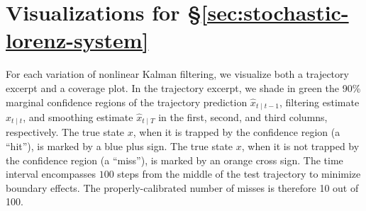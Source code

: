 \documentclass{article} %
\begin{document}
\section{Visualizations for \S\ref{sec:stochastic-lorenz-system}}
\label{sec:visualizations}
For each variation of nonlinear Kalman filtering, we visualize both a trajectory excerpt and a coverage plot.
In the trajectory excerpt, we shade in green the 90\% marginal confidence regions of the trajectory prediction \(\hat x_{t \mid t-1}\), filtering estimate \(\hat x_{t \mid t}\), and smoothing estimate \(\hat x_{t \mid T}\) in the first, second, and third columns, respectively.
The true state \(x\), when it is trapped by the confidence region (a ``hit''), is marked by a blue plus sign.
The true state \(x\), when it is not trapped by the confidence region (a ``miss''), is marked by an orange cross sign.
The time interval encompasses \(100\) steps from the middle of the test trajectory to minimize boundary effects.
The properly-calibrated number of misses is therefore 10 out of 100.


 


\end{document}
